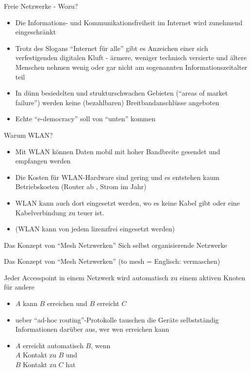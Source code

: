 \documentclass[aspectratio=43]{beamer}
\begin{document}
\begin{frame}{Freie Netzwerke - Wozu?} %
	\begin{itemize}
		\item Die Informations- und Kommunikationsfreiheit im Internet wird zunehmend eingeschränkt
		\item Trotz des Slogans ``Internet für alle'' gibt es Anzeichen einer sich verfestigenden digitalen Kluft - ärmere, weniger technisch versierte und ältere Menschen nehmen wenig oder gar nicht am sogenannten Informationszeitalter teil
		\item In dünn besiedelten und strukturschwachen Gebieten (``areas of market failure'') werden keine (bezahlbaren) Breitbandanschlüsse angeboten
		\item Echte ``e-democracy'' soll von ``unten'' kommen
	\end{itemize}
\end{frame}

\begin{frame}{Warum WLAN?}
	\begin{itemize}
		\item Mit WLAN können Daten mobil mit hoher Bandbreite gesendet und empfangen werden
		\item Die Kosten für WLAN-Hardware sind gering und es entstehen kaum Betriebskosten (Router ab , Strom  im Jahr)
		\item WLAN kann auch dort eingesetzt werden, wo es keine Kabel gibt oder eine Kabelverbindung zu teuer ist. %
		\item (WLAN kann von jedem lizenzfrei eingesetzt werden) %
	\end{itemize}
\end{frame}

\begin{frame}{Das Konzept von ``Mesh Netzwerken''} %
	Sich selbst organisierende Netzwerke
\end{frame}

\begin{frame}{Das Konzept von ``Mesh Netzwerken''} %
	(to mesh = Englisch: vermaschen)

	Jeder Accesspoint in einem Netzwerk wird automatisch zu einem aktiven Knoten für andere
	\begin{itemize}
		\item $A$ kann $B$ erreichen und $B$ erreicht $C$
		\item ueber ``ad-hoc routing''-Protokolle tauschen die Geräte selbstständig Informationen darüber aus, wer wen erreichen kann
		\item $A$ erreicht automatisch $B$, wenn\\
		$A$ Kontakt zu $B$ und\\
		$B$ Kontakt zu $C$ hat
	\end{itemize}
\end{frame}
\end{document}
